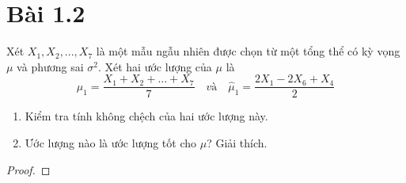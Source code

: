 \newcommand{\N}{\mathbb{N}}
\newcommand{\Z}{\mathbb{Z}}

\section*{Bài 1.2}
%

\begin{problem}{1.2}
Xét $X_1,X_2,...,X_7$ là một mẫu ngẫu nhiên được chọn từ một tổng thể có kỳ vọng $\mu$ và phương sai $\sigma^2$. Xét hai ước lượng của $\mu$ là
\[ \hat{\mu}_1 = \dfrac{X_1+X_2+...+X_7}{7} \quad \textit{và} \quad \hat{\mu}_1 = \dfrac{2X_1-2X_6+X_4}{2}\]
\begin{enumerate}[label=(\alph*)]
	\item Kiểm tra tính không chệch của hai ước lượng này.
	\item Ước lượng nào là ước lượng tốt cho $\mu$? Giải thích.
\end{enumerate}
\end{problem}

\begin{proof}
\end{proof}